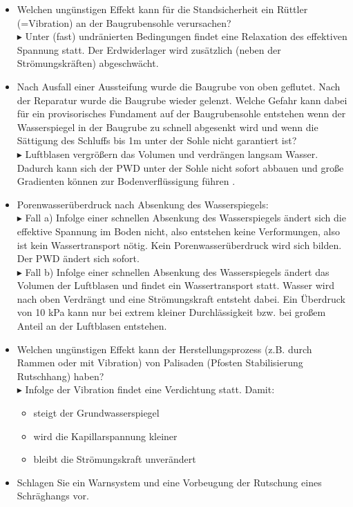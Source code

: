 \documentclass[fleqn,twoside]{article}
\begin{document}
\begin{itemize}
\item Welchen ungünstigen Effekt kann für die Standsicherheit ein Rüttler (=Vibration) an der
Baugrubensohle verursachen?\\
$\blacktriangleright$ Unter (fast) undränierten Bedingungen findet eine Relaxation des effektiven Spannung statt. Der
Erdwiderlager wird zusätzlich (neben der Strömungskräften) abgeschwächt.
\item Nach Ausfall einer Aussteifung wurde die Baugrube von oben geflutet. Nach der Reparatur wurde die Baugrube wieder gelenzt. Welche Gefahr kann dabei für ein provisorisches Fundament auf der Baugrubensohle entstehen wenn der Wasserspiegel in der Baugrube zu schnell abgesenkt wird und wenn die Sättigung des Schluffs bis 1m unter der Sohle nicht garantiert ist?\\ 
$\blacktriangleright$ Luftblasen vergrößern das Volumen und verdrängen langsam Wasser. Dadurch kann sich der PWD unter der Sohle nicht sofort abbauen und große Gradienten können zur Bodenverflüssigung führen .
\item Porenwasserüberdruck nach Absenkung des Wasserspiegels:\\
$\blacktriangleright$ Fall a) Infolge einer schnellen Absenkung des Wasserspiegels ändert sich die effektive Spannung
im Boden nicht, also entstehen keine Verformungen, also ist kein Wassertransport nötig. Kein Porenwasserüberdruck
wird sich bilden. Der PWD ändert sich sofort.\\
$\blacktriangleright$ Fall b) Infolge einer schnellen Absenkung des Wasserspiegels ändert das Volumen der Luftblasen
und findet ein Wassertransport statt. Wasser wird nach oben Verdrängt und eine Strömungskraft
entsteht dabei. Ein Überdruck von 10 kPa kann nur bei extrem kleiner Durchlässigkeit bzw. bei
großem Anteil an der Luftblasen entstehen.
\item Welchen ungünstigen Effekt kann der Herstellungsprozess (z.B. durch Rammen oder mit
Vibration) von Palisaden (Pfosten Stabilisierung Rutschhang) haben?\\
$\blacktriangleright$ Infolge der Vibration findet eine Verdichtung statt. Damit:
\begin{itemize}
 \item steigt der Grundwasserspiegel
 \item wird die Kapillarspannung kleiner
 \item bleibt die Strömungskraft unverändert
\end{itemize}
\item Schlagen Sie ein Warnsystem und eine Vorbeugung der Rutschung eines Schräghangs vor.\\

\end{itemize}
\end{document}
